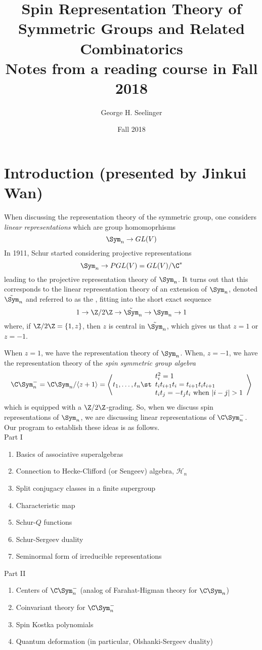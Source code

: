 \documentclass[11pt,leqno,oneside]{amsbook}
\title[Spin Representation Theory of Symmetric Groups]{Spin
  Representation Theory of Symmetric Groups and Related Combinatorics \\ Notes
  from a reading course in Fall 2018}
\author{George H. Seelinger}
\date{Fall 2018}
\renewcommand{\H}{\mathcal{H}}
\numberwithin{thm}{section}
\begin{document}
\maketitle
\section{Introduction (presented by Jinkui Wan)}
When discussing the representation theory of the symmetric group, one
considers \emph{linear representations} which are group
homomoprhisms \[
  \Sym_n \to GL(V)
\]
In 1911, Schur started considering projective representations \[
  \Sym_n \to PGL(V) = GL(V)/\C^*
\]
leading to the projective representation theory of \(\Sym_n\). It
turns out that this corresponds to the linear representation theory of
an extension of \(\Sym_n\), denoted \(\tilde{\Sym}_n\) and referred to as
the , fitting into the
short exact sequence \[
  1 \to \Z/2\Z \to \tilde{\Sym}_n \to \Sym_n \to 1
\]
where, if \(\Z/2\Z = \{1,z\}\), then \(z\) is central in
\(\tilde{\Sym}_n\), which gives us that \(z = 1\) or \(z=-1\).

When \(z=1\), we have the representation theory of \(\Sym_n\). When,
\(z=-1\), we have the representation theory of the \emph{spin
  symmetric group algebra}
\[
\C\Sym_n^- = \C\Sym_n/\langle z+1 \rangle = \left\langle t_1, \ldots, t_n
\st
\begin{array}{l}
  t_i^2=1\\
  t_i t_{i+1} t_i = t_{i+1} t_i t_{i+1}\\
  t_i t_j = -t_j t_i \text{ when }|i-j|>1
\end{array}
\right\rangle
\]
which is equipped with a \(\Z/2\Z\)-grading. So, when we discuss
spin representations of \(\Sym_n\), we are discussing linear
representations of \(\C\Sym_n^-\). Our program to establish these
ideas is as follows. \\

Part I
\begin{enumerate}[label=(\arabic*)]
\item Basics of associative superalgebras
\item Connection to Hecke-Clifford (or Sengeev) algebra, \(\H_n\)
\item Split conjugacy classes in a finite supergroup
\item Characteristic map
\item Schur-\(Q\) functions
\item Schur-Sergeev duality
\item Seminormal form of irreducible representations
\end{enumerate}
Part II
\begin{enumerate}[label=(\arabic*)]
\item Centers of \(\C\Sym_n^-\) (analog of Farahat-Higman theory for
  \(\C\Sym_n\))
\item Coinvariant theory for \(\C\Sym_n^-\)
\item Spin Kostka polynomials
\item Quantum deformation (in particular, Olshanki-Sergeev duality)
\end{enumerate}
\end{document}
